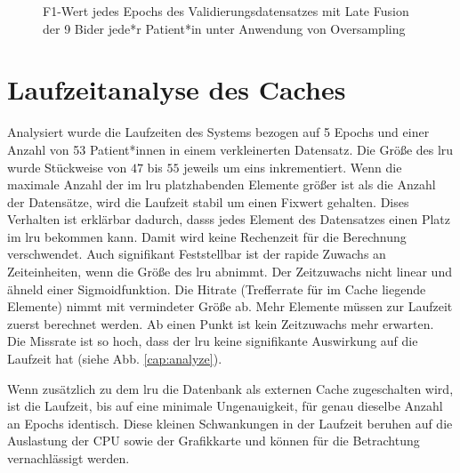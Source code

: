\begin{figure}[b]\centering
\makebox[0pt]{}
\caption[F1-Wert jedes Epochs des Validierungsdatensatzes mit Late Fusion unter Anwendung von Oversampling]{F1-Wert jedes Epochs des Validierungsdatensatzes mit Late Fusion der 9 Bider jede*r Patient*in unter Anwendung von Oversampling}\label{cap:f1_lf_oversampling}
\end{figure}\label{fig:f1_lf_oversampling}






















\clearpage
\section{Laufzeitanalyse des Caches}\label{analyze}
Analysiert wurde die Laufzeiten des Systems bezogen auf 5 Epochs und einer Anzahl von 53 Patient*innen in einem verkleinerten Datensatz. Die Größe des \ac{lru} wurde Stückweise von $47$ bis $55$ jeweils um eins inkrementiert. Wenn die maximale Anzahl der im \ac{lru} platzhabenden Elemente größer ist als die Anzahl der Datensätze, wird die Laufzeit stabil um einen Fixwert gehalten. Dises Verhalten ist erklärbar dadurch, dasss jedes Element des Datensatzes einen Platz im \ac{lru} bekommen kann. Damit wird keine Rechenzeit für die Berechnung verschwendet. Auch signifikant Feststellbar ist der rapide Zuwachs an Zeiteinheiten, wenn die Größe des \ac{lru} abnimmt. Der Zeitzuwachs nicht linear und ähneld einer Sigmoidfunktion. Die Hitrate (Trefferrate für im Cache liegende Elemente) nimmt mit vermindeter Größe ab. Mehr Elemente müssen zur Laufzeit zuerst berechnet werden. Ab einen Punkt ist kein Zeitzuwachs mehr erwarten. Die Missrate ist so hoch, dass der \ac{lru} keine signifikante Auswirkung auf die Laufzeit hat (siehe Abb. \ref{cap:analyze}).

Wenn zusätzlich zu dem \ac{lru} die Datenbank als externen Cache zugeschalten wird, ist die Laufzeit, bis auf eine minimale Ungenauigkeit, für genau dieselbe Anzahl an Epochs identisch. Diese kleinen Schwankungen in der Laufzeit beruhen auf die Auslastung der CPU sowie der Grafikkarte und können für die Betrachtung vernachlässigt werden.

